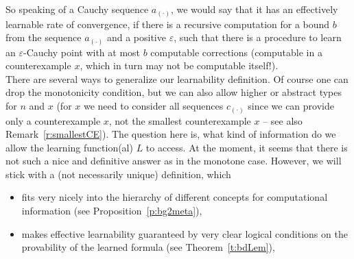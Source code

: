\documentclass[1p]{elsarticle}
\theoremstyle{plain}
\theoremstyle{definition}
\theoremstyle{remark}
\renewcommand{\epsilon}{\varepsilon}
\theoremstyle{definition}
\begin{document}
So speaking of a Cauchy sequence $a_{(\cdot)}$, we would say that it has an effectively learnable rate of convergence, if there is a recursive computation for a bound $b$ from the sequence $a_{(\cdot)}$ and a positive $\epsilon$, such that there is a procedure to learn an $\epsilon$-Cauchy point with at most $b$ computable corrections (computable in a counterexample $x$, which in turn may not be computable itself!).\\

There are several ways to generalize our learnability definition. 
Of course one can drop the monotonicity condition, but we can also allow higher or abstract types for $n$ and $x$ (for $x$ we need to consider all sequences $c_{(\cdot)}$ since we can provide only a counterexample $x$, not the smallest counterexample $x$ -- see also Remark~\ref{r:smallestCE}). The question here is, what kind of information do we allow the learning function(al) $L$ to access. At the moment, it seems that there is not such a nice and definitive answer as in the monotone case. However, we will stick with a (not necessarily unique) definition, which
\begin{itemize} 
\item fits very nicely into the hierarchy of different concepts for computational information (see Proposition~\ref{p:bg2meta}),
\item makes effective learnability guaranteed by very clear logical conditions on the provability of the learned formula (see Theorem~\ref{t:bdLem}),
\end{itemize} 
\end{document}
